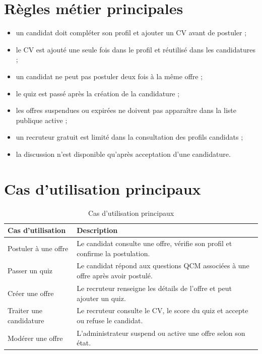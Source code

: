 \section{Règles métier principales}

\begin{itemize}
    \item un candidat doit compléter son profil et ajouter un CV avant de postuler ;
    \item le CV est ajouté une seule fois dans le profil et réutilisé dans les candidatures ;
    \item un candidat ne peut pas postuler deux fois à la même offre ;
    \item le quiz est passé après la création de la candidature ;
    \item les offres suspendues ou expirées ne doivent pas apparaître dans la liste publique active ;
    \item un recruteur gratuit est limité dans la consultation des profils candidats ;
    \item la discussion n'est disponible qu'après acceptation d'une candidature.
\end{itemize}

\section{Cas d'utilisation principaux}

\begin{table}[h!]
\centering
\renewcommand{\arraystretch}{1.4}
\begin{tabular}{|p{4cm}|p{9cm}|}
\hline
\textbf{Cas d'utilisation} & \textbf{Description} \\
\hline
Postuler à une offre & Le candidat consulte une offre, vérifie son profil et confirme la postulation. \\
\hline
Passer un quiz & Le candidat répond aux questions QCM associées à une offre après avoir postulé. \\
\hline
Créer une offre & Le recruteur renseigne les détails de l'offre et peut ajouter un quiz. \\
\hline
Traiter une candidature & Le recruteur consulte le CV, le score du quiz et accepte ou refuse le candidat. \\
\hline
Modérer une offre & L'administrateur suspend ou active une offre selon son état. \\
\hline
\end{tabular}
\caption{Cas d'utilisation principaux}
\label{tab:cas_utilisation}
\end{table}
